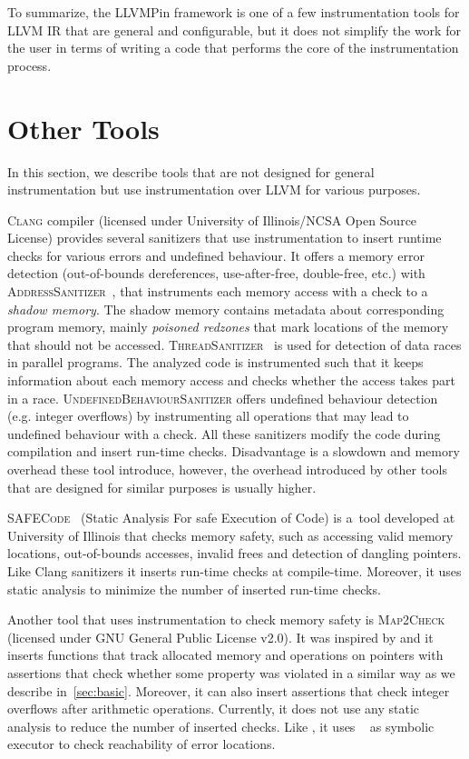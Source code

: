 To summarize, the LLVMPin framework is one of a few instrumentation tools for
LLVM IR that are general and configurable, but it does not simplify the work
for the user in terms of writing a code that performs the core of the
instrumentation process.

\section{Other Tools}

In this section, we describe tools that are not designed for general
instrumentation but use instrumentation over LLVM for various purposes.

\textsc{Clang} compiler (licensed under University of Illinois/NCSA Open Source
License) provides several sanitizers that use instrumentation to insert runtime
checks for various errors and undefined behaviour. It offers a memory error
detection (out-of-bounds dereferences, use-after-free, double-free, etc.) with
\textsc{AddressSanitizer}~\cite{asan}, that instruments each memory access with
a check to a \textit{shadow memory}. The shadow memory contains metadata about
corresponding program memory, mainly \textit{poisoned redzones} that mark
locations of the memory that should not be accessed.
\textsc{ThreadSanitizer}~\cite{tsan} is used for detection of data races in
parallel programs. The analyzed code is instrumented such that it keeps
information about each memory access and checks whether the access takes part
in a race.  \textsc{UndefinedBehaviourSanitizer} offers undefined behaviour
detection (e.g. integer overflows) by instrumenting all operations that may
lead to undefined behaviour with a check. All these sanitizers modify the code
during compilation and insert run-time checks. Disadvantage is a slowdown and
memory overhead these tool introduce, however, the overhead introduced by other
tools that are designed for similar purposes is usually higher.

\textsc{SAFECode}~\cite{safecode} (Static Analysis For safe Execution of Code)
is a~tool developed at University of Illinois that checks memory safety, such
as accessing valid memory locations, out-of-bounds accesses, invalid frees and
detection of dangling pointers. Like Clang sanitizers it inserts run-time
checks at compile-time. Moreover, it uses static analysis to minimize the
number of inserted run-time checks.

Another tool that uses instrumentation to check memory safety is
\textsc{Map2Check}~\cite{map2check} (licensed under GNU General Public License
v2.0). It was inspired by \symbiotic and it inserts functions that track
allocated memory and operations on pointers with assertions that check whether
some property was violated in a similar way as we describe in~\ref{sec:basic}.
Moreover, it can also insert assertions that check integer overflows after
arithmetic operations. Currently, it does not use any static analysis to reduce
the number of inserted checks. Like \symbiotic, it uses \klee~\cite{klee} as
symbolic executor to check reachability of error locations.

